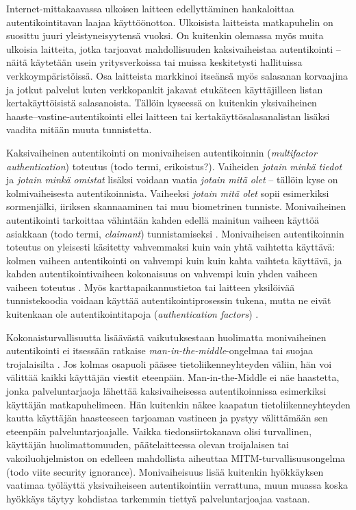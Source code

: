 \documentclass[finnish,gradu]{tktltiki}
\begin{document}
  Internet-mittakaavassa ulkoisen laitteen edellyttäminen hankaloittaa autentikointitavan laajaa käyttöönottoa. Ulkoisista laitteista matkapuhelin on suosittu juuri yleistyneisyytensä vuoksi. On kuitenkin olemassa myös muita ulkoisia laitteita, jotka tarjoavat mahdollisuuden kaksivaiheistaa autentikointi -- näitä käytetään usein yritysverkoissa tai muissa keskitetysti hallituissa verkkoympäristöissä. Osa laitteista markkinoi itseänsä myös salasanan korvaajina ja jotkut palvelut kuten verkkopankit jakavat etukäteen käyttäjilleen listan kertakäyttöisistä salasanoista. Tällöin kyseessä on kuitenkin yksivaiheinen haaste--vastine-autentikointi ellei laitteen tai kertakäyttösalasanalistan lisäksi vaadita mitään muuta tunnistetta.

  Kaksivaiheinen autentikointi on monivaiheisen autentikoinnin (\emph{multifactor authentication}) toteutus (todo termi, erikoistus?).
  Vaiheiden \emph{jotain minkä tiedot} ja \emph{jotain minkä omistat} lisäksi voidaan vaatia \emph{jotain mitä olet} -- tällöin kyse on kolmivaiheisesta autentikoinnista. Vaiheeksi \emph{jotain mitä olet} sopii esimerkiksi sormenjälki, iiriksen skannaaminen tai muu biometrinen tunniste. Monivaiheinen autentikointi tarkoittaa vähintään kahden edellä mainitun vaiheen käyttöä asiakkaan (todo termi, \emph{claimant}) tunnistamiseksi \cite{NIST_SP800-63-1}. Monivaiheisen autentikoinnin toteutus on yleisesti käsitetty vahvemmaksi kuin vain yhtä vaihtetta käyttävä: kolmen vaiheen autentikointi on vahvempi kuin kuin kahta vaihteta käyttävä, ja kahden autentikointivaiheen kokonaisuus on vahvempi kuin yhden vaiheen vaiheen toteutus \cite{NIST_SP800-63-1}. Myös karttapaikannustietoa tai laitteen yksilöivää tunnistekoodia voidaan käyttää autentikointiprosessin tukena, mutta ne eivät kuitenkaan ole autentikointitapoja (\emph{authentication factors}) \cite{NIST_SP800-63-1}.

  Kokonaisturvallisuutta lisäävästä vaikutuksestaan huolimatta monivaiheinen autentikointi ei itsessään ratkaise \emph{man-in-the-middle}-ongelmaa tai suojaa trojalaisilta \cite{schneier_2factor_2005}. Jos kolmas osapuoli pääsee tietoliikenneyhteyden väliin, hän voi välittää kaikki käyttäjän viestit eteenpäin. Man-in-the-Middle ei näe haastetta, jonka palveluntarjaoja lähettää kaksivaiheisessa autentikoinnissa esimerkiksi käyttäjän matkapuhelimeen. Hän kuitenkin näkee kaapatun tietoliikenneyhteyden kautta käyttäjän haasteeseen tarjoaman vastineen ja pystyy välittämään sen eteenpäin palveluntarjoajalle. Vaikka tiedonsiirtokanava olisi turvallinen, käyttäjän huolimattomuuden, päätelaitteessa olevan troijalaisen tai vakoiluohjelmiston on edelleen mahdollista aiheuttaa MITM-turvallisuusongelma~\cite{schneier_2factor_2012} (todo viite security ignorance). Monivaiheisuus lisää kuitenkin hyökkäyksen vaatimaa työläyttä yksivaiheiseen autentikointiin verrattuna, muun muassa koska hyökkäys täytyy kohdistaa tarkemmin tiettyä palveluntarjoajaa vastaan.
\end{document}
